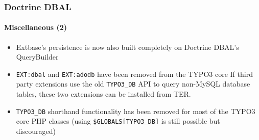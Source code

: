 \begin{frame}[fragile]
	\frametitle{Doctrine DBAL}
	\framesubtitle{Miscellaneous (2)}

	\begin{itemize}
		\item Extbase's persistence is now also built completely on Doctrine DBAL's QueryBuilder
		\item \texttt{EXT:dbal} and \texttt{EXT:adodb} have been removed from the TYPO3 core\newline
			\smaller
				If third party extensions use the old \texttt{TYPO3\_DB} API to query non-MySQL database tables,
				these two extensions can be installed from TER.
			\normalsize

		\item \texttt{TYPO3\_DB} shorthand functionality has been removed for most of the TYPO3 core PHP classes\newline
			\smaller
				(using \texttt{\$GLOBALS[TYPO3\_DB]} is still possible but discouraged)
			\normalsize

	\end{itemize}

\end{frame}

